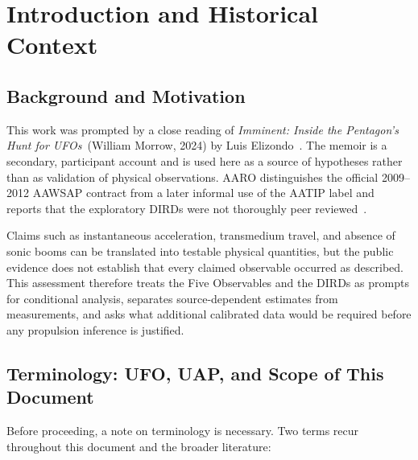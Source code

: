 \documentclass[aps,prd,twocolumn,superscriptaddress,nofootinbib,floatfix]{revtex4-2}
\begin{document}
\section{Introduction and Historical Context}\label{sec:introduction}

\subsection{Background and Motivation}\label{sec:background}

This work was prompted by a close reading of \textit{Imminent: Inside the
Pentagon's Hunt for UFOs}~(William Morrow, 2024) by Luis
Elizondo~\cite{Elizondo2024}. The memoir is a secondary, participant account and
is used here as a source of hypotheses rather than as validation of physical
observations. AARO distinguishes the official 2009--2012 AAWSAP contract from a
later informal use of the AATIP label and reports that the exploratory DIRDs were
not thoroughly peer reviewed~\cite{AARO2024}.

Claims such as instantaneous acceleration, transmedium travel, and absence of
sonic booms can be translated into testable physical quantities, but the public
evidence does not establish that every claimed observable occurred as described.
This assessment therefore treats the Five Observables and the DIRDs as prompts for
conditional analysis, separates source-dependent estimates from measurements, and
asks what additional calibrated data would be required before any propulsion
inference is justified.

\subsection{Terminology: UFO, UAP, and Scope of This Document}\label{sec:terminology}

Before proceeding, a note on terminology is necessary. Two terms recur
throughout this document and the broader literature:
\end{document}
